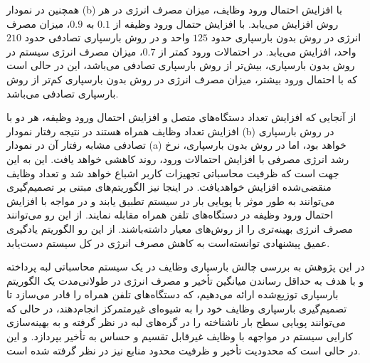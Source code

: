همچنین در نمودار (b) با افزایش احتمال ورود وظایف، میزان مصرف انرژی در هر روش افزایش می‌یابد. با افزایش حتمال ورود وظیفه از $‌0.1$  به $0.9$، میزان مصرف انرژی در روش بدون بارسپاری حدود $125$ واحد و در روش بارسپاری تصادفی حدود $‌210$ واحد، افزایش می‌یابد. در احتمالات ورود کمتر از $0.7$، میزان مصرف انرژی سیستم در روش بدون بارسپاری، بیش‌تر از روش بارسپاری تصادفی می‌باشد، این در حالی است که با احتمال ورود بیشتر، میزان مصرف انرژی در روش بدون بارسپاری کم‌تر از روش بارسپاری تصادفی می‌باشد. 

از آنجایی که افزایش تعداد دستگاه‌های متصل و افزایش احتمال ورود وظیفه، هر دو با افزایش تعداد وظایف همراه هستند در نتیجه رفتار نمودار (b) در روش بارسپاری تصادفی مشابه رفتار آن در نمودار (a) خواهد بود، اما در روش بدون بارسپاری، نرخ رشد انرژی مصرفی با افزایش احتمالات ورود، روند کاهشی خواهد یافت. این به این جهت است که ظرفیت محاسباتی تجهیزات کاربر اشباع خواهد شد و تعداد ‌وظایف منقضی‌شده افزایش خواهدیافت. در اینجا نیز الگوریتم‌های مبتنی بر تصمیم‌گیری می‌توانند به طور موثر با پویایی بار در سیستم تطبیق یابند و در مواجه با افزایش احتمال ورود وظیفه در دستگاه‌های تلفن همراه مقابله نمایند. از این رو می‌توانند مصرف انرژی بهینه‌تری را از روش‌های معیار داشته‌باشند. از این رو الگوریتم یادگیری عمیق پیشنهادی توانسته‌است به کاهش مصرف انرژی در کل سیستم دست‌یابد. 



 

 



در این پژوهش به بررسی چالش بارسپاری وظایف در یک سیستم محاسباتی لبه پرداخته و با هدف به حداقل رساندن میانگین تأخیر و مصرف انرژی در طولانی‌مدت یک الگوریتم بارسپاری توزیع‌شده ارائه می‌دهیم، که دستگاه‌های تلفن همراه را قادر می‌سازد تا تصمیم‌گیری بارسپاری وظایف خود را به شیوه‌ای غیرمتمرکز انجام‌دهند، در حالی که می‌توانند پویایی سطح بار ناشناخته را در گره‌های لبه در نظر گرفته و به بهینه‌سازی کارایی سیستم در مواجهه با وظایف غیرقابل تقسیم و حساس به تأخیر بپردازد. و این در حالی است که محدودیت تأخیر و ظرفیت محدود منابع نیز در نظر گرفته شده است. 


